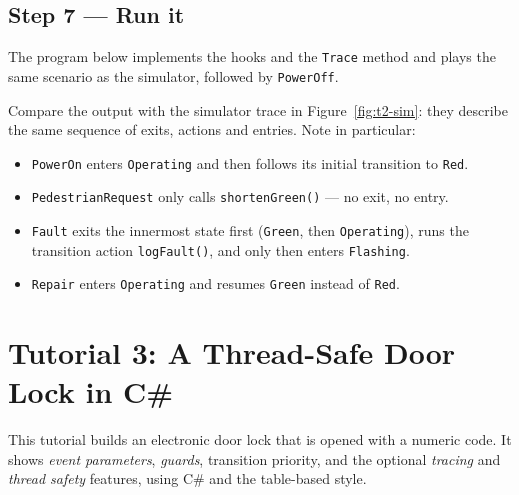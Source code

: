 \documentclass[11pt,a4paper,openany]{report}
\newcommand{\code}[1]{\texttt{#1}}
\begin{document}
\section{Step 7 --- Run it}
The program below implements the hooks and the \code{Trace} method and plays the same scenario as the
simulator, followed by \code{PowerOff}.





Compare the output with the simulator trace in Figure~\ref{fig:t2-sim}: they describe the same
sequence of exits, actions and entries. Note in particular:
\begin{itemize}[itemsep=1pt]
  \item \code{PowerOn} enters \code{Operating} and then follows its initial transition to \code{Red}.
  \item \code{PedestrianRequest} only calls \code{shortenGreen()} --- no exit, no entry.
  \item \code{Fault} exits the innermost state first (\code{Green}, then \code{Operating}), runs the
        transition action \code{logFault()}, and only then enters \code{Flashing}.
  \item \code{Repair} enters \code{Operating} and resumes \code{Green} instead of \code{Red}.
\end{itemize}

\chapter{Tutorial 3: A Thread-Safe Door Lock in C\#}
\label{ch:tut3}

This tutorial builds an electronic door lock that is opened with a numeric code. It shows
\emph{event parameters}, \emph{guards}, transition priority, and the optional \emph{tracing} and
\emph{thread safety} features, using C\# and the table-based style.
\end{document}
